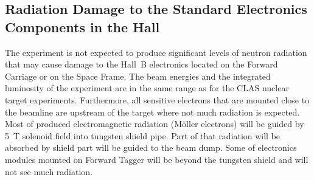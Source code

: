 \documentclass [12pt]{article}
\begin{document}
\subsection{Radiation Damage to the Standard Electronics Components in the Hall}

The experiment is not expected to produce significant levels of neutron radiation that may cause 
damage to the Hall~B electronics located on the Forward Carriage or on the Space Frame. The beam 
energies and the integrated luminosity of the experiment are in the same range as for the CLAS 
nuclear target experiments. Furthermore, all sensitive electrons that are mounted close to the 
beamline are upstream of the target where not much radiation is expected. Most of produced 
electromagnetic radiation (M{\"o}ller electrons) will be guided by 5~T solenoid field into tungsten 
shield pipe. Part of that radiation will be absorbed by shield part will be guided to the beam 
dump. Some of electronics modules mounted on Forward Tagger will be beyond the tungsten shield 
and will not see much radiation. 
\end{document}
